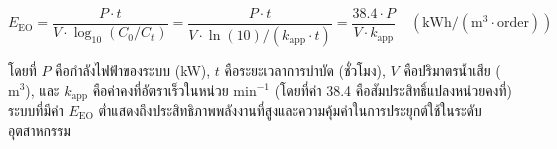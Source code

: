 \begin{equation}
    E_{\text{EO}} = \frac{P \cdot t}{V \cdot \log_{10} (C_0 / C_t)} = \frac{P \cdot t}{V \cdot \ln(10) / (k_{\text{app}} \cdot t)} = \frac{38.4 \cdot P}{V \cdot k_{\text{app}}} \quad (\text{kWh}/(\text{m}^3\cdot\text{order}))
    \label{eq:eeo_formula}
\end{equation}

โดยที่ $P$ คือกำลังไฟฟ้าของระบบ (kW), $t$ คือระยะเวลาการบำบัด (ชั่วโมง), $V$ คือปริมาตรน้ำเสีย ($\text{m}^3$), และ $k_{\text{app}}$ คือค่าคงที่อัตราเร็วในหน่วย $\text{min}^{-1}$ (โดยที่ค่า 38.4 คือสัมประสิทธิ์แปลงหน่วยคงที่) ระบบที่มีค่า $E_{\text{EO}}$ ต่ำแสดงถึงประสิทธิภาพพลังงานที่สูงและความคุ้มค่าในการประยุกต์ใช้ในระดับอุตสาหกรรม

